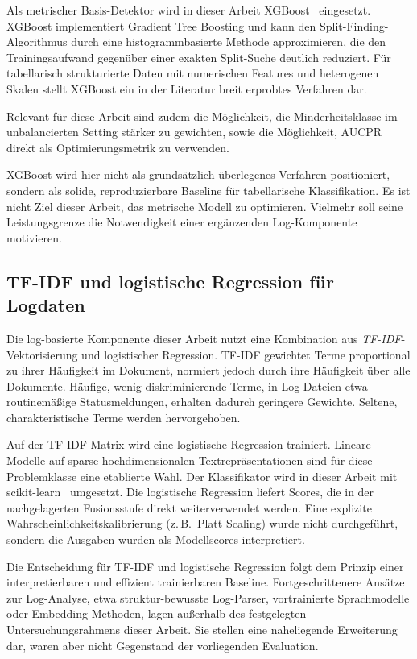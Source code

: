 Als metrischer Basis-Detektor wird in dieser Arbeit XGBoost~\cite{chen2016xgboost}
eingesetzt. XGBoost implementiert Gradient Tree Boosting und kann den
Split-Finding-Algorithmus durch eine histogrammbasierte Methode approximieren,
die den Trainingsaufwand gegenüber einer exakten Split-Suche deutlich
reduziert. Für tabellarisch strukturierte Daten mit numerischen
Features und heterogenen Skalen stellt XGBoost ein in der Literatur breit erprobtes
Verfahren dar.

Relevant für diese Arbeit sind zudem die Möglichkeit, die Minderheitsklasse im
unbalancierten Setting stärker zu gewichten, sowie die Möglichkeit, AUCPR direkt
als Optimierungsmetrik zu verwenden.

XGBoost wird hier nicht als grundsätzlich überlegenes Verfahren positioniert, sondern
als solide, reproduzierbare Baseline für tabellarische Klassifikation. Es ist nicht
Ziel dieser Arbeit, das metrische Modell zu optimieren. Vielmehr soll seine
Leistungsgrenze die Notwendigkeit einer ergänzenden Log-Komponente motivieren.

\subsection{TF-IDF und logistische Regression für Logdaten}

Die log-basierte Komponente dieser Arbeit nutzt eine Kombination aus
\emph{TF-IDF}-Vektori\-sie\-rung und logistischer Regression. TF-IDF gewichtet Terme proportional zu ihrer
Häufigkeit im Dokument, normiert jedoch durch ihre Häufigkeit über alle Dokumente.
Häufige, wenig diskriminierende Terme, in Log-Dateien etwa routinemäßige
Statusmeldungen, erhalten dadurch geringere Gewichte. Seltene, charakteristische
Terme werden hervorgehoben.

Auf der TF-IDF-Matrix wird eine logistische Regression trainiert. Lineare Modelle
auf sparse hochdimensionalen Textrepräsentationen sind für diese Problemklasse
eine etablierte Wahl. Der Klassifikator wird in dieser Arbeit mit
scikit-learn~\cite{pedregosa2011scikit} umgesetzt. Die logistische Regression
liefert Scores, die in der nachgelagerten Fusionsstufe
direkt weiterverwendet werden. Eine explizite Wahrscheinlichkeitskalibrierung
(z.\,B.\ Platt Scaling) wurde nicht durchgeführt, sondern die Ausgaben wurden als
Modellscores interpretiert.

Die Entscheidung für TF-IDF und logistische Regression folgt dem Prinzip einer
interpretierbaren und effizient trainierbaren Baseline. Fortgeschrittenere Ansätze zur Log-Analyse, etwa struktur-bewusste
Log-Parser, vortrainierte Sprachmodelle oder Embedding-Methoden, lagen außerhalb des
festgelegten Untersuchungsrahmens dieser Arbeit. Sie stellen eine naheliegende
Erweiterung dar, waren aber nicht Gegenstand der vorliegenden Evaluation.

